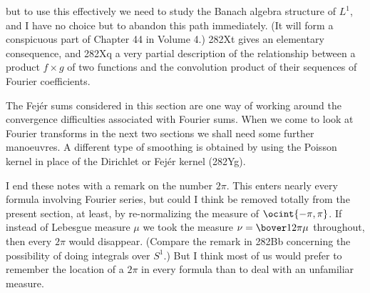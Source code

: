 {

\noindent  but to use this effectively we need to study the Banach
algebra structure of $L^1$, and I have no choice but to abandon this
path immediately.   (It will form a conspicuous part of Chapter 44 in
Volume 4.)   282Xt gives an elementary
consequence, and 282Xq a very partial description of the
relationship between a product $f\times g$ of two functions and the
convolution product of their sequences of Fourier coefficients.

The Fej\'er sums considered in this section are one way of working
around the convergence difficulties associated with Fourier sums.   When we
come to look at Fourier transforms in the next two sections we shall need
some further manoeuvres.   A different type of smoothing is
obtained by using the Poisson kernel in place of the Dirichlet or Fej\'er
kernel (282Yg).

I end these notes with a remark on the number $2\pi$.   This enters
nearly every formula involving Fourier series, but could I think be
removed totally from the present section, at least, by re-normalizing
the measure of $\ocint{-\pi,\pi}$.   If instead of Lebesgue measure
$\mu$ we took the measure $\nu=\bover1{2\pi}\mu$ throughout, then every
$2\pi$ would disappear.   (Compare the remark in 282Bb concerning the
possibility of doing integrals over $S^1$.)   But I think most of us
would prefer to remember the location of a $2\pi$ in every formula than
to deal with an unfamiliar measure.
}%

\discrpage

